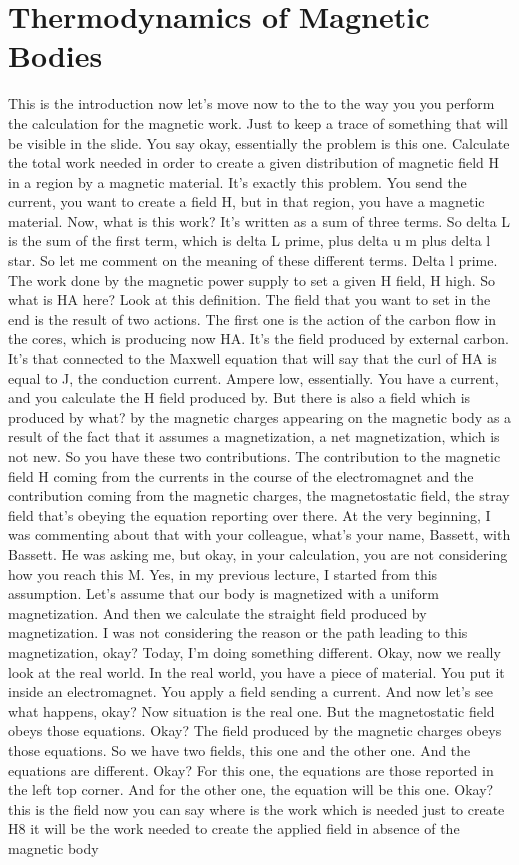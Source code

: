 \chapter{Thermodynamics of Magnetic Bodies}
This is the introduction now let's move now to the to the way you you perform the calculation for the magnetic work. Just to keep a trace of something that will be visible in the slide. You say okay, essentially the problem is this one. Calculate the total work needed in order to create a given distribution of magnetic field H in a region by a magnetic material. It's exactly this problem. You send the current, you want to create a field H, but in that region, you have a magnetic material. Now, what is this work? It's written as a sum of three terms. So delta L is the sum of the first term, which is delta L prime, plus delta u m plus delta l star. So let me comment on the meaning of these different terms. Delta l prime. The work done by the magnetic power supply to set a given H field, H high. So what is HA here? Look at this definition. The field that you want to set in the end is the result of two actions. The first one is the action of the carbon flow in the cores, which is producing now HA. It's the field produced by external carbon. It's that connected to the Maxwell equation that will say that the curl of HA is equal to J, the conduction current. Ampere low, essentially. You have a current, and you calculate the H field produced by. But there is also a field which is produced by what? by the magnetic charges appearing on the magnetic body as a result of the fact that it assumes a magnetization, a net magnetization, which is not new. So you have these two contributions. The contribution to the magnetic field H coming from the currents in the course of the electromagnet and the contribution coming from the magnetic charges, the magnetostatic field, the stray field that's obeying the equation reporting over there. At the very beginning, I was commenting about that with your colleague, what's your name, Bassett, with Bassett. He was asking me, but okay, in your calculation, you are not considering how you reach this M. Yes, in my previous lecture, I started from this assumption. Let's assume that our body is magnetized with a uniform magnetization. And then we calculate the straight field produced by magnetization. I was not considering the reason or the path leading to this magnetization, okay? Today, I'm doing something different. Okay, now we really look at the real world. In the real world, you have a piece of material. You put it inside an electromagnet. You apply a field sending a current. And now let's see what happens, okay? Now situation is the real one. But the magnetostatic field obeys those equations. Okay? The field produced by the magnetic charges obeys those equations. So we have two fields, this one and the other one. And the equations are different. Okay? For this one, the equations are those reported in the left top corner. And for the other one, the equation will be this one. Okay? this is the field now you can say where is the work which is needed just to create H8 it will be the work needed to create the applied field in absence of the magnetic body 